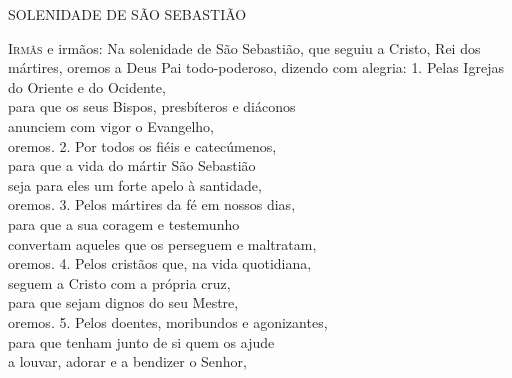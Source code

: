 \documentclass{book}
\begin{document}
\pagestyle{empty}
\begin{center}
    \large{SOLENIDADE DE SÃO SEBASTIÃO}
    \vspace{.2cm} \\
\end{center}
\lettrine[findent=2pt]{\color{VioletRed1}I}{rmãs} e irmãos:
\newline
Na solenidade de São Sebastião,
\newline
que seguiu a Cristo, Rei dos mártires,
\newline
oremos a Deus Pai todo-poderoso,
\newline
dizendo com alegria:
\vspace{.2cm}
\newline
{}
\vspace{.2cm}
\newline
{\color{VioletRed1} 1.} Pelas Igrejas do Oriente e do Ocidente,\\
para que os seus Bispos, presbíteros e diáconos\\
anunciem com vigor o Evangelho,\\
oremos.
\vspace{.1cm}
\newline
{\color{VioletRed1} 2.} Por todos os fiéis e catecúmenos,\\
para que a vida do mártir São Sebastião\\
seja para eles um forte apelo à santidade,\\
oremos.
\vspace{.1cm}
\newline
{\color{VioletRed1} 3.} Pelos mártires da fé em nossos dias,\\
para que a sua coragem e testemunho\\
convertam aqueles que os perseguem e maltratam,\\
oremos.
\vspace{.1cm}
\newline
{\color{VioletRed1} 4.} Pelos cristãos que, na vida quotidiana,\\
seguem a Cristo com a própria cruz,\\
para que sejam dignos do seu Mestre,\\
oremos.
\vspace{.1cm}
\newline
{\color{VioletRed1} 5.} Pelos doentes, moribundos e agonizantes,\\
para que tenham junto de si quem os ajude\\
a louvar, adorar e a bendizer o Senhor,\\
\end{document}
